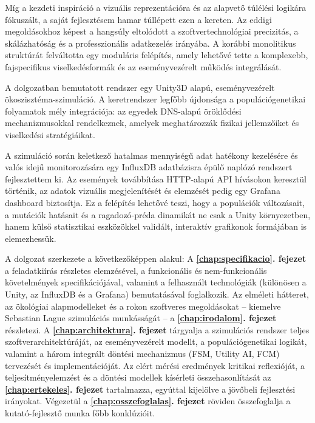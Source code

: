 Míg a kezdeti inspiráció a vizuális reprezentációra és az alapvető túlélési logikára fókuszált, a saját fejlesztésem hamar túllépett ezen a kereten. Az eddigi megoldásokhoz képest a hangsúly eltolódott a szoftvertechnológiai precizitás, a skálázhatóság és a professzionális adatkezelés irányába. A korábbi monolitikus struktúrát felváltotta egy moduláris felépítés, amely lehetővé tette a komplexebb, fajspecifikus viselkedésformák és az eseményvezérelt működés integrálását.

A dolgozatban bemutatott rendszer egy Unity3D alapú, eseményvezérelt ökoszisztéma-szimuláció. A keretrendszer legfőbb újdonsága a populációgenetikai folyamatok mély integrációja: az egyedek DNS-alapú öröklődési mechanizmusokkal rendelkeznek, amelyek meghatározzák fizikai jellemzőiket és viselkedési stratégiáikat.

A szimuláció során keletkező hatalmas mennyiségű adat hatékony kezelésére és valós idejű monitorozására egy InfluxDB adatbázisra épülő naplózó rendszert fejlesztettem ki. Az események továbbítása HTTP-alapú API hívásokon keresztül történik, az adatok vizuális megjelenítését és elemzését pedig egy Grafana dashboard biztosítja. Ez a felépítés lehetővé teszi, hogy a populációk változásait, a mutációk hatásait és a ragadozó-préda dinamikát ne csak a Unity környezetben, hanem külső statisztikai eszközökkel validált, interaktív grafikonok formájában is elemezhessük.

A dolgozat szerkezete a következőképpen alakul: A \textbf{\ref{chap:specifikacio}. fejezet} a feladatkiírás részletes elemzésével, a funkcionális és nem-funkcionális követelmények specifikációjával, valamint a felhasznált technológiák (különösen a Unity, az InfluxDB és a Grafana) bemutatásával foglalkozik. Az elméleti hátteret, az ökológiai alapmodelleket és a rokon szoftveres megoldásokat – kiemelve Sebastian Lague szimulációs munkásságát – a \textbf{\ref{chap:irodalom}. fejezet} részletezi. A \textbf{\ref{chap:architektura}. fejezet} tárgyalja a szimulációs rendszer teljes szoftverarchitektúráját, az eseményvezérelt modellt, a populációgenetikai logikát, valamint a három integrált döntési mechanizmus (FSM, Utility AI, FCM) tervezését és implementációját. Az elért mérési eredmények kritikai reflexióját, a teljesítményelemzést és a döntési modellek kísérleti összehasonlítását az \textbf{\ref{chap:ertekeles}. fejezet} tartalmazza, egyúttal kijelölve a jövőbeli fejlesztési irányokat. Végezetül a \textbf{\ref{chap:osszefoglalas}. fejezet} röviden összefoglalja a kutató-fejlesztő munka főbb konklúzióit.